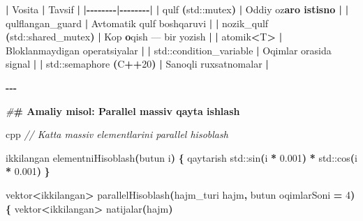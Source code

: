 \documentclass[a4paper,11pt,twoside,openright]{book}
\newenvironment{Shaded}{\begin{snugshade}}{\end{snugshade}}
\newcommand{\BuiltInTok}[1]{#1}
\newcommand{\CharTok}[1]{\textcolor[rgb]{0.31,0.60,0.02}{#1}}
\newcommand{\CommentTok}[1]{\textcolor[rgb]{0.56,0.35,0.01}{\textit{#1}}}
\newcommand{\DecValTok}[1]{\textcolor[rgb]{0.00,0.00,0.81}{#1}}
\newcommand{\ErrorTok}[1]{\textcolor[rgb]{0.64,0.00,0.00}{\textbf{#1}}}
\newcommand{\FloatTok}[1]{\textcolor[rgb]{0.00,0.00,0.81}{#1}}
\newcommand{\NormalTok}[1]{#1}
\newcommand{\OperatorTok}[1]{\textcolor[rgb]{0.81,0.36,0.00}{\textbf{#1}}}
\newcommand{\PreprocessorTok}[1]{\textcolor[rgb]{0.56,0.35,0.01}{\textit{#1}}}
\begin{document}
\begin{Shaded}
\begin{Highlighting}[]
\OperatorTok{|}\NormalTok{ Vosita }\OperatorTok{|}\NormalTok{ Tavsif }\OperatorTok{|}
\OperatorTok{|{-}{-}{-}{-}{-}{-}{-}{-}|{-}{-}{-}{-}{-}{-}{-}{-}|}
\OperatorTok{|} \ErrorTok{\textasciigrave{}}\NormalTok{qulf}\ErrorTok{\textasciigrave{}} \OperatorTok{(}\ErrorTok{\textasciigrave{}}\BuiltInTok{std::}\NormalTok{mutex}\ErrorTok{\textasciigrave{}}\OperatorTok{)} \OperatorTok{|}\NormalTok{ Oddiy o}\CharTok{\textquotesingle{}z}\ErrorTok{aro istisno |}
\OperatorTok{|} \ErrorTok{\textasciigrave{}}\NormalTok{qulflangan\_guard}\ErrorTok{\textasciigrave{}} \OperatorTok{|}\NormalTok{ Avtomatik qulf boshqaruvi }\OperatorTok{|}
\OperatorTok{|} \ErrorTok{\textasciigrave{}}\NormalTok{nozik\_qulf}\ErrorTok{\textasciigrave{}} \OperatorTok{(}\ErrorTok{\textasciigrave{}}\BuiltInTok{std::}\NormalTok{shared\_mutex}\ErrorTok{\textasciigrave{}}\OperatorTok{)} \OperatorTok{|}\NormalTok{ Ko}\CharTok{\textquotesingle{}p}\ErrorTok{ o}\CharTok{\textquotesingle{}}\NormalTok{qish — bir yozish }\OperatorTok{|}
\OperatorTok{|} \ErrorTok{\textasciigrave{}}\NormalTok{atomik}\OperatorTok{\textless{}}\NormalTok{T}\OperatorTok{\textgreater{}}\ErrorTok{\textasciigrave{}} \OperatorTok{|}\NormalTok{ Bloklanmaydigan operatsiyalar }\OperatorTok{|}
\OperatorTok{|} \ErrorTok{\textasciigrave{}}\BuiltInTok{std::}\NormalTok{condition\_variable}\ErrorTok{\textasciigrave{}} \OperatorTok{|}\NormalTok{ Oqimlar orasida signal }\OperatorTok{|}
\OperatorTok{|} \ErrorTok{\textasciigrave{}}\BuiltInTok{std::}\NormalTok{semaphore}\ErrorTok{\textasciigrave{}} \OperatorTok{(}\NormalTok{C}\OperatorTok{++}\DecValTok{20}\OperatorTok{)} \OperatorTok{|}\NormalTok{ Sanoqli ruxsatnomalar }\OperatorTok{|}

\OperatorTok{{-}{-}{-}}

\PreprocessorTok{\#}\ErrorTok{\# Amaliy misol: Parallel massiv qayta ishlash}

\ErrorTok{\textasciigrave{}\textasciigrave{}\textasciigrave{}}\NormalTok{cpp}
\CommentTok{// Katta massiv elementlarini parallel hisoblash}

\NormalTok{ikkilangan elementniHisoblash}\OperatorTok{(}\NormalTok{butun i}\OperatorTok{)} \OperatorTok{\{}
\NormalTok{    qaytarish }\BuiltInTok{std::}\NormalTok{sin}\OperatorTok{(}\NormalTok{i }\OperatorTok{*} \FloatTok{0.001}\OperatorTok{)} \OperatorTok{*} \BuiltInTok{std::}\NormalTok{cos}\OperatorTok{(}\NormalTok{i }\OperatorTok{*} \FloatTok{0.001}\OperatorTok{)}
\OperatorTok{\}}

\NormalTok{vektor}\OperatorTok{\textless{}}\NormalTok{ikkilangan}\OperatorTok{\textgreater{}}\NormalTok{ parallelHisoblash}\OperatorTok{(}\NormalTok{hajm\_turi hajm}\OperatorTok{,}\NormalTok{ butun oqimlarSoni }\OperatorTok{=} \DecValTok{4}\OperatorTok{)} \OperatorTok{\{}
\NormalTok{    vektor}\OperatorTok{\textless{}}\NormalTok{ikkilangan}\OperatorTok{\textgreater{}}\NormalTok{ natijalar}\OperatorTok{(}\NormalTok{hajm}\OperatorTok{)}


\end{Highlighting}
\end{Shaded}
\end{document}
